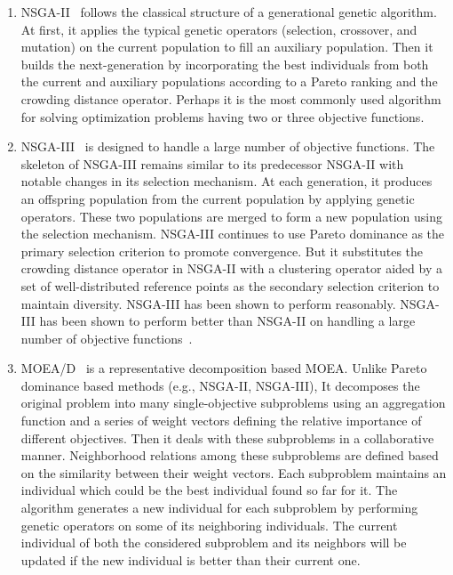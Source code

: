 \begin{enumerate}[label=(\alph*)]
	
	\item NSGA-II~\citep{deb2002fast} follows the classical structure of a generational genetic algorithm. At first, it applies the typical genetic operators (selection, crossover, and mutation) on the current population to fill an auxiliary population. Then it builds the next-generation by incorporating the best individuals from both the current and auxiliary populations according to a Pareto ranking and the crowding distance operator. Perhaps it is the most commonly used algorithm for solving optimization problems having two or three objective functions. 
	
	\item NSGA-III~\citep{deb2014evolutionary} is designed to handle a large number of objective functions. The skeleton of NSGA-III remains similar to its predecessor NSGA-II with notable changes in its selection mechanism. At each generation, it produces an offspring population from the current population by applying genetic operators. These two populations are merged to form a new population using the selection mechanism. NSGA-III continues to use Pareto dominance as the primary selection criterion to promote convergence. But it substitutes the crowding distance operator in NSGA-II with a clustering operator aided by a set of well-distributed reference points as the secondary selection criterion to maintain diversity. NSGA-III has been shown to perform reasonably. NSGA-III has been shown to perform better than NSGA-II on handling a large number of objective functions~\cite{deb2014evolutionary}.
	
	\item MOEA/D~\citep{zhang2007moea} is a representative decomposition based MOEA. Unlike Pareto dominance based methods (e.g., NSGA-II, NSGA-III), It decomposes the original problem into many single-objective subproblems using an aggregation function and a series of weight vectors defining the relative importance of different objectives. %
	Then it deals with these subproblems in a collaborative manner. Neighborhood relations among these subproblems are defined based on the similarity between their weight vectors. 
	Each subproblem maintains an individual which could be the best individual found so far for it. The algorithm generates a new individual for each subproblem by performing genetic operators on some of its neighboring individuals. The current individual of both the considered subproblem and its neighbors will be updated if the new individual is better than their current one. %
\end{enumerate} 



